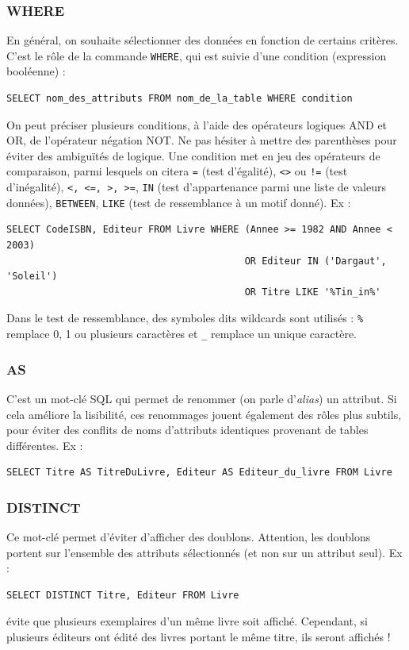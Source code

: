 \documentclass[french,11pt,twoside]{VcCours}
\begin{document}
\subsubsection*{WHERE}

En général, on souhaite sélectionner des données en fonction de certains critères. C'est le rôle de la commande \verb'WHERE', qui est suivie d'une condition (expression booléenne) : 
\begin{verbatim}
SELECT nom_des_attributs FROM nom_de_la_table WHERE condition
\end{verbatim}
On peut préciser plusieurs conditions, à l'aide des opérateurs logiques AND et OR, de l'opérateur négation NOT. Ne pas hésiter à mettre des parenthèses pour éviter des ambiguïtés de logique. Une condition met en jeu des opérateurs de comparaison, parmi lesquels on citera \verb'=' (test d'égalité), \verb'<>' ou \verb'!=' (test d'inégalité), \verb'<, <=, >, >=', \verb'IN' (test d'appartenance parmi une liste de valeurs données), \verb'BETWEEN', \verb'LIKE' (test de ressemblance à un motif donné). Ex : 
\begin{verbatim}
SELECT CodeISBN, Editeur FROM Livre WHERE (Annee >= 1982 AND Annee < 2003) 
                                          OR Editeur IN ('Dargaut', 'Soleil') 
                                          OR Titre LIKE '%Tin_in%'
\end{verbatim}
Dans le test de ressemblance, des symboles dits wildcards sont utilisés : \verb'%' remplace 0, 1 ou plusieurs caractères et \verb'_' remplace un unique caractère.


\subsubsection*{AS}

C'est un mot-clé SQL qui permet de renommer (on parle d'\emph{alias}) un attribut. Si cela améliore la lisibilité, ces renommages jouent également des rôles plus subtils, pour éviter des conflits de noms d'attributs identiques provenant de tables différentes. Ex :
\begin{verbatim}
SELECT Titre AS TitreDuLivre, Editeur AS Editeur_du_livre FROM Livre
\end{verbatim}


\subsubsection*{DISTINCT}

Ce mot-clé permet d'éviter d'afficher des doublons. Attention, les doublons portent sur l'ensemble des attributs sélectionnés (et non sur un attribut seul). Ex : 
\begin{verbatim}
SELECT DISTINCT Titre, Editeur FROM Livre
\end{verbatim}
évite que plusieurs exemplaires d'un même livre soit affiché. Cependant, si plusieurs éditeurs ont édité des livres portant le même titre, ils seront affichés !
\end{document}
